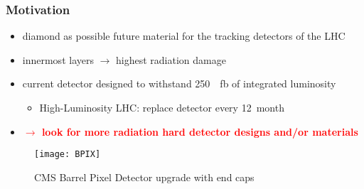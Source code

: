 \begin{frame}
	\frametitle{Motivation}
	\begin{itemize}
		\item diamond as possible future material for the tracking detectors of the LHC
		\item innermost layers $\rightarrow$ highest radiation damage
		\item current detector designed to withstand \SI{250}{\per\femto\barn} of integrated luminosity
		\begin{itemize}
			\vspace*{4pt}
			\item High-Luminosity LHC: replace detector every \SI{12}{month}
		\end{itemize}
		\item \textbf{\textcolor{red}{$\rightarrow$ look for more radiation hard detector designs and/or materials}}
	\end{itemize}
	\begin{figure}
		\centering
		\texttt{[image: BPIX]}
		\caption{CMS Barrel Pixel Detector upgrade with end caps}
	\end{figure}
\end{frame}